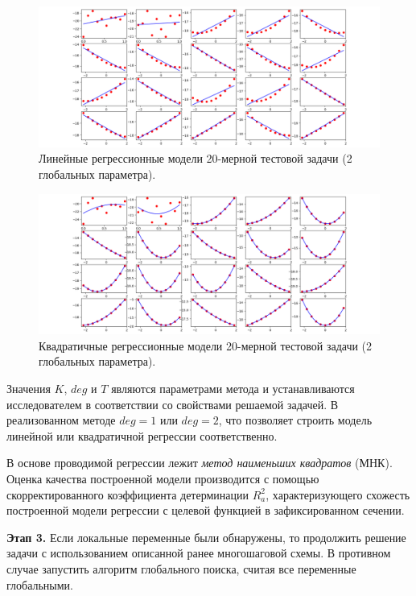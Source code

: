 \documentclass[11pt, oneside, a4paper]{article}
\begin{document}
\begin{figure}[h!]
\centering \includegraphics[width=1\linewidth]{regression_94}
\caption{Линейные регрессионные модели 20-мерной тестовой задачи  (2 глобальных параметра).}\label{regression_94_}
\end{figure}
\begin{figure}[h!]
\centering \includegraphics[width=1\linewidth]{regression_94_3}
\caption{Квадратичные регрессионные модели 20-мерной тестовой задачи (2 глобальных параметра).}\label{regression_94_3_}
\end{figure}

Значения  $K$, $deg$ и $T$ являются параметрами метода и устанавливаются исследователем в соответствии со свойствами решаемой задачей. В реализованном методе $deg = 1$ или $deg = 2$, что позволяет строить модель линейной или квадратичной регрессии соответственно.

В основе проводимой регрессии лежит \textit{метод наименьших квадратов} (МНК). Оценка качества построенной модели производится с помощью скорректированного коэффициента детерминации $R^2_a$, характеризующего схожесть построенной модели регрессии с целевой функцией в зафиксированном сечении. 

\textbf{Этап 3.} Если локальные переменные были обнаружены, то продолжить решение задачи с использованием описанной ранее многошаговой схемы. В противном случае запустить алгоритм глобального поиска, считая все переменные глобальными.
\end{document}
